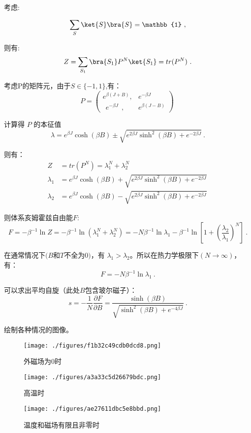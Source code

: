考虑:

\begin{equation}
\sum_S\ket{S}\bra{S}=\mathbb{1}~,
\end{equation}

则有:
\begin{equation}
Z=\sum\limits_{S_1}\bra{S_1}P^N\ket{S_1}=tr(P^N)~.
\end{equation}

考虑P的矩阵元，由于$S\in\{-1,1\}$,有：
$$P=\begin{pmatrix}
e^{\beta(J+B)},&e^{-\beta J} \\
~~e^{-\beta J}~~, & e^{\beta(J-B)}
\end{pmatrix}~$$

计算得 $P$ 的本征值
$$\lambda=e^{\beta J}\cosh{(\beta B)}\pm \sqrt{e^{2\beta J }\sinh^2{(\beta B)}+e^{-2\beta J }}~.$$

则有：
\begin{align}
Z&=tr(P^N)=\lambda_1^N+\lambda_2^N \\
\lambda_1&=e^{\beta J}\cosh{(\beta B)}+ \sqrt{e^{2\beta J }\sinh^2{(\beta B)}+e^{-2\beta J }} \\
\lambda_2&=e^{\beta J}\cosh{(\beta B)}- \sqrt{e^{2\beta J }\sinh^2{(\beta B)}+e^{-2\beta J }}~
\end{align}

则体系亥姆霍兹自由能$F$:
$$F=-\beta^{-1}\ln{Z}=-\beta^{-1}\ln{(\lambda_1^N+\lambda_2^N)}=-N\beta^{-1}\ln{\lambda_1}-\beta^{-1}\ln[1+(\frac{\lambda_2}{\lambda_1})^N]~.$$

在通常情况下$(B$和$T$不全为$0)$，有 $\lambda_1>\lambda_2$。所以在热力学极限下$(N\rightarrow\infty)$，有：
$$F=-N\beta^{-1}\ln{\lambda_1}~.$$

可以求出平均自旋（此处$B$包含玻尔磁子）：
$$s=-\frac{1}{N}\frac{\partial F}{\partial B}=\frac{\sinh(\beta B)}{\sqrt{\sinh^2(\beta B)+e^{-4\beta J}}}~.$$

绘制各种情况的图像。

\begin{figure}[ht]
\centering
\texttt{[image: ./figures/f1b32c49cdb0dcd8.png]}
\caption{外磁场为0时} \label{fig_Ising_1}
\end{figure}

\begin{figure}[ht]
\centering
\texttt{[image: ./figures/a3a33c5d26679bdc.png]}
\caption{高温时} \label{fig_Ising_2}
\end{figure}

\begin{figure}[ht]
\centering
\texttt{[image: ./figures/ae27611dbc5e8bbd.png]}
\caption{温度和磁场有限且非零时} \label{fig_Ising_3}
\end{figure}

